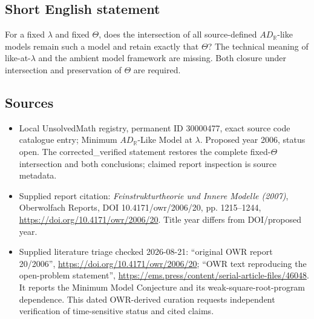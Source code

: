 \documentclass[11pt]{article}
\newcommand{\R}{\mathbb{R}}
\begin{document}
\subsection{Short English statement}
For a fixed $\lambda$ and fixed $\Theta$, does the intersection of all source-defined $AD_{\R}$-like models remain such a model and retain exactly that $\Theta$? The technical meaning of like-at-$\lambda$ and the ambient model framework are missing. Both closure under intersection and preservation of $\Theta$ are required.
\subsection{Sources}
\begin{itemize}
\item Local UnsolvedMath registry, permanent ID 30000477, exact source code catalogue entry; Minimum $AD_{\R}$-Like Model at $\lambda$. Proposed year 2006, status open. The corrected\_verified statement restores the complete fixed-$\Theta$ intersection and both conclusions; claimed report inspection is source metadata.
\item Supplied report citation: \emph{Feinstrukturtheorie und Innere Modelle (2007)}, Oberwolfach Reports, DOI 10.4171/owr/2006/20, pp. 1215--1244, \url{https://doi.org/10.4171/owr/2006/20}. Title year differs from DOI/proposed year.
\item Supplied literature triage checked 2026-08-21: ``original OWR report 20/2006'', \url{https://doi.org/10.4171/owr/2006/20}; ``OWR text reproducing the open-problem statement'', \url{https://ems.press/content/serial-article-files/46048}. It reports the Minimum Model Conjecture and its weak-square-root-program dependence. This dated OWR-derived curation requests independent verification of time-sensitive status and cited claims.
\end{itemize}
\end{document}
